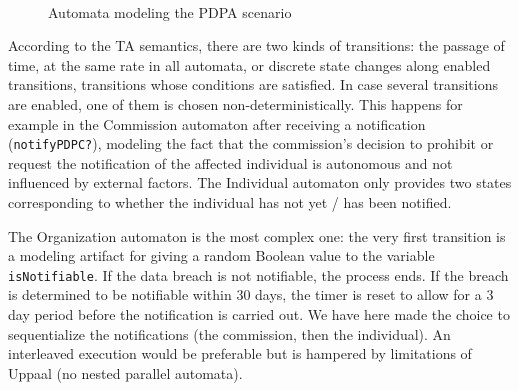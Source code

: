 \begin{figure}[htp]
\centering
{}\hfil
{}\\
\caption{Automata modeling the PDPA scenario}\label{fig:pdpa}
\end{figure}

According to the TA semantics, there are two kinds of transitions: the passage
of time, at the same rate in all automata, or discrete state changes along
enabled transitions, \ie{} transitions whose conditions are satisfied. In case
several transitions are enabled, one of them is chosen
non-deterministically. This happens for example in the Commission automaton
after receiving a notification (\texttt{notifyPDPC?}), modeling the fact that
the commission's decision to prohibit or request the notification of the
affected individual is autonomous and not influenced by external factors.
The Individual automaton only provides two states corresponding to whether the
individual has not yet / has been notified.

The Organization automaton is the
most complex one: the very first transition is a modeling artifact for giving
a random Boolean value to the variable \texttt{isNotifiable}. If the data
breach is not notifiable, the process ends. If the breach is determined to be
notifiable within 30 days, the timer is reset to allow for a 3 day period before
the notification is carried out. We have here made the choice to sequentialize
the notifications (the commission, then the individual). An interleaved execution
would be preferable but is hampered by limitations of Uppaal (no nested
parallel automata).

